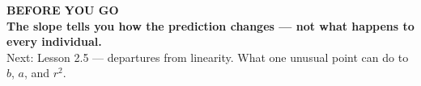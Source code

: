 \documentclass[aspectratio=169, 11pt]{beamer}
\begin{document}
{
\begin{frame}[plain]
  \vspace{1.5cm}\hspace{0.8cm}%
  \begin{minipage}{0.86\textwidth}
    {\color{goldacc}\bfseries\small BEFORE YOU GO}\\[0.7cm]
    {\color{white}\bfseries\Large The slope tells you how the prediction changes --- not what
    happens to every individual.}\\[0.9cm]
    {\color{skymid}\small Next: Lesson 2.5 --- departures from linearity. What one unusual
    point can do to $b$, $a$, and $r^2$.}
  \end{minipage}
\end{frame}
}
\end{document}
